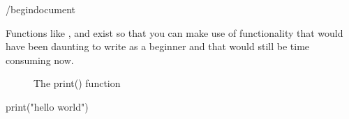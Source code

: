 /begin{document}

Functions like ,  and  exist so that you can make use of functionality that would have been daunting to write as a beginner and that would still be time consuming now.

\begin{figure}[H]
    \caption{The print() function} \label{fig:print_function}
\end{figure}


\begin{python}
print("hello world")
\end{python}